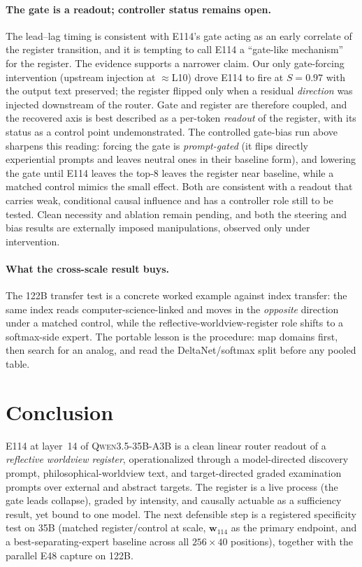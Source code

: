 \documentclass[10pt,a4paper,twocolumn]{article}
\newcommand{\Sel}{\textit{S}}
\newcommand{\wvec}{\mathbf{w}_{114}}
\begin{document}
\paragraph{The gate is a readout; controller status remains open.}
The lead--lag timing is consistent with E114's gate acting as an early correlate
of the register transition, and it is tempting to call E114 a ``gate-like
mechanism'' for the register. The evidence supports a narrower claim. Our only gate-forcing
intervention (upstream injection at $\approx$L10) drove E114 to fire at
$\Sel{=}0.97$ with the output text preserved; the register flipped only
when a residual \emph{direction} was injected downstream of the router. Gate and
register are therefore coupled, and the recovered axis is best described as a
per-token \emph{readout} of the register, with its status as a control point
undemonstrated.
The controlled gate-bias run above sharpens this reading: forcing the gate is
\emph{prompt-gated} (it flips directly experiential prompts and leaves neutral ones
in their baseline form), and lowering the gate until E114 leaves the top-8 leaves the
register near baseline, while a matched control mimics the small effect. Both are
consistent with a readout that carries weak, conditional causal influence and
has a controller role still to be tested. Clean necessity and ablation remain pending,
and both the steering and bias results are externally imposed manipulations,
observed only under intervention.

\paragraph{What the cross-scale result buys.}
The 122B transfer test is a concrete worked example against index transfer: the
same index reads computer-science-linked and moves in the \emph{opposite}
direction under a matched control, while the reflective-worldview-register role shifts to a
softmax-side expert. The portable lesson is the procedure: map domains first, then search for an
analog, and read the DeltaNet/softmax split before any pooled table.

\section{Conclusion}

E114 at layer~14 of \textsc{Qwen3.5-35B-A3B} is a clean linear router readout of a
\emph{reflective worldview register}, operationalized through a model-directed
discovery prompt, philosophical-worldview text, and target-directed graded
examination prompts over external and abstract targets. The register is a live
process (the gate leads collapse), graded by intensity, and causally actuable as a
sufficiency result, yet bound to one model. The next defensible step is a
registered specificity test on 35B (matched register/control at scale, $\wvec$ as
the primary endpoint, and a best-separating-expert baseline across all
$256{\times}40$ positions), together with the parallel E48 capture on 122B.
\end{document}
